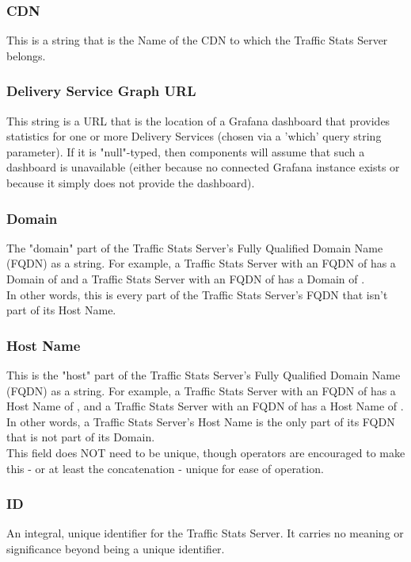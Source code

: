\subsubsection{CDN}
This is a string that is the Name of the CDN to which the Traffic Stats Server
belongs.

\subsubsection{Delivery Service Graph URL}
This string is a URL that is the location of a Grafana dashboard that provides
statistics for one or more Delivery Services (chosen via a 'which' query string
parameter). If it is "null"-typed, then components will assume that such a
dashboard is unavailable (either because no connected Grafana instance exists or
because it simply does not provide the dashboard).

\subsubsection{Domain}
The "domain" part of the Traffic Stats Server's Fully Qualified Domain Name
(FQDN) as a string. For example, a Traffic Stats Server with an FQDN of
 has a Domain of  and a Traffic Stats Server with an
FQDN of  has a Domain of .\\
In other words, this is every part of the Traffic Stats Server's FQDN that
isn't part of its Host Name.

\subsubsection{Host Name}
This is the "host" part of the Traffic Stats Server's Fully Qualified Domain
Name (FQDN) as a string. For example, a Traffic Stats Server with an FQDN of
 has a Host Name of , and a Traffic Stats Server
with an FQDN of  has a Host Name of
.\\
In other words, a Traffic Stats Server's Host Name is the only part of its FQDN
that is not part of its Domain.\\
This field does NOT need to be unique, though operators are encouraged to make
this - or at least the concatenation  -
unique for ease of operation.

\subsubsection{ID}
An integral, unique identifier for the Traffic Stats Server. It carries no
meaning or significance beyond being a unique identifier.

